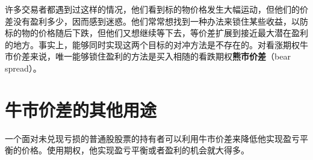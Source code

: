 许多交易者都遇到过这样的情况，他们看到标的物价格发生大幅运动，但他们的价差没有盈利多少，因而感到迷惑。他们常常想找到一种办法来锁住某些收益，以防标的物的价格随后下跌，但他们又想继续等下去，等价差扩展到接近最大潜在盈利的地方。事实上，能够同时实现这两个目标的对冲方法是不存在的。对看涨期权牛市价差来说，唯一能够锁住盈利的方法是买入相随的看跌期权\textbf{熊市价差}（bear spread）。
\section{牛市价差的其他用途}
一个面对未兑现亏损的普通股股票的持有者可以利用牛市价差来降低他实现盈亏平衡的价格。使用期权，他实现盈亏平衡或者盈利的机会就大得多。